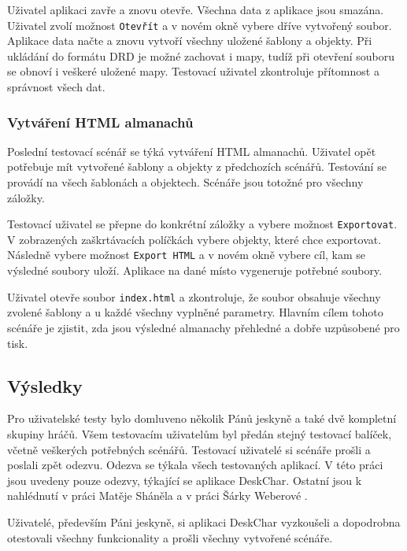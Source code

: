 \documentclass[thesis=B,czech]{resources/FITthesis}[2012/06/26]
\begin{document}
Uživatel aplikaci zavře a znovu otevře. Všechna data z aplikace jsou smazána. Uživatel zvolí možnost \texttt{Otevřít} a v novém okně vybere dříve vytvořený soubor. Aplikace data načte a znovu vytvoří všechny uložené šablony a objekty. Při ukládání do formátu DRD je možné zachovat i mapy, tudíž při otevření souboru se obnoví i veškeré uložené mapy. Testovací uživatel zkontroluje přítomnost a správnost všech dat. 

\subsubsection{Vytváření HTML almanachů}
Poslední testovací scénář se týká vytváření HTML almanachů. Uživatel opět potřebuje mít vytvořené šablony a objekty z předchozích scénářů. Testování se provádí na všech šablonách a objektech. Scénáře jsou totožné pro všechny záložky. \par

Testovací uživatel se přepne do konkrétní záložky a vybere možnost \texttt{Exportovat}. V zobrazených zaškrtávacích políčkách vybere objekty, které chce exportovat. Následně vybere možnost \texttt{Export HTML} a v novém okně vybere cíl, kam se výsledné soubory uloží. Aplikace na dané místo vygeneruje potřebné soubory. \par

Uživatel otevře soubor \texttt{index.html} a zkontroluje, že soubor obsahuje všechny zvolené šablony a u každé všechny vyplněné parametry. Hlavním cílem tohoto scénáře je zjistit, zda jsou výsledné almanachy přehledné a dobře uzpůsobené pro tisk.

\subsection{Výsledky}
Pro uživatelské testy bylo domluveno několik Pánů jeskyně a také dvě kompletní skupiny hráčů. Všem testovacím uživatelům byl předán stejný testovací balíček, včetně veškerých potřebných scénářů. Testovací uživatelé si scénáře prošli a poslali zpět odezvu. Odezva se týkala všech testovaných aplikací. V této práci jsou uvedeny pouze odezvy, týkající se aplikace DeskChar. Ostatní jsou k nahlédnutí v práci Matěje Sháněla\cite{Shanel_2017} a v práci Šárky Weberové \cite{Weberova_2017}. \par

Uživatelé, především Páni jeskyně, si aplikaci DeskChar vyzkoušeli a dopodrobna otestovali všechny funkcionality a prošli všechny vytvořené scénáře. \par
\end{document}
